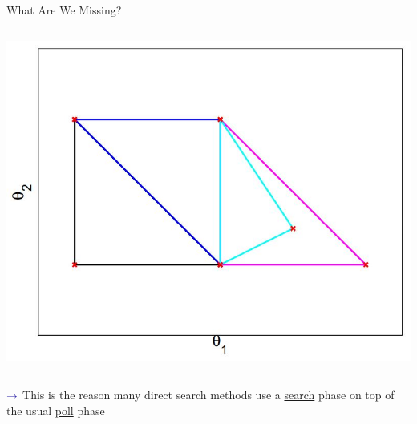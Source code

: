 \documentclass[handout,aspectratio=54]{beamer}
\numberwithin{theorem}{section}
\begin{document}
\begin{frame}{What Are We Missing?}
\begin{columns}
\includegraphics[width=\textwidth]{fig/18-4.jpg}
\end{columns}

\vspace{0.5cm}
$\textcolor{blue}{\rightarrow}$
This is the reason many direct search methods use a \underline{search} phase on top of the usual \underline{poll} phase
\end{frame}

\end{document}
